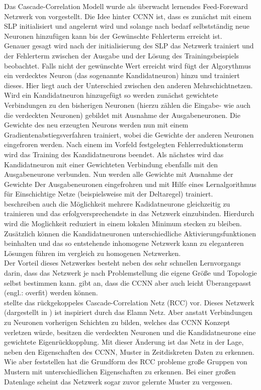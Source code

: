 Das Cascade-Correlation Modell wurde als überwacht lernendes Feed-Foreward Netzwerk von \citet{Fahlman1990} vorgestellt. Die Idee hinter CCNN ist, dass es zunächst mit einem SLP initialisiert und angelernt wird und solange nach bedarf selbstständig neue Neuronen hinzufügen kann bis der Gewünschte Fehlerterm erreicht ist.\\
Genauer gesagt wird nach der initialisierung des SLP das Netzwerk trainiert und der Fehlerterm zwischen der Ausgabe und der Lösung des Trainingsbeispiels beobachtet. Falls nicht der gewünschte Wert erreicht wird fügt der Algorythmus ein verdecktes Neuron (das sogenannte Kandidatneuron) hinzu und trainiert dieses. Hier liegt auch der Unterschied zwischen den anderen Mehrschichtnetzen. Wird ein Kandidatneuron hinzugefügt so werden zunächst gewichtete Verbindungen zu den bisherigen Neuronen (hierzu zählen die Eingabe- wie auch die verdeckten Neuronen) gebildet mit Ausnahme der Ausgabeneuronen. Die Gewichte des neu erzeugten Neurons werden nun mit einem Gradientenabstiegsverfahren trainiert, wobei die Gewichte der anderen Neuronen eingefroren werden. Nach einem im Vorfeld festgelegten Fehlerreduktionsterm wird das Training des Kandidatneurons beendet. Als nächstes wird das Kandidatneuron mit einer Gewichteten Verbindung ebenfalls mit den Ausgabeneurone verbunden. Nun werden alle Gewichte mit Ausnahme der Gewichte Der Ausgabeneuronen eingefrohren und mit Hilfe eines Lernalgorithmus für Einschichtige Netze (beispielsweise mit der Deltaregel) trainiert.\\
\citet{Fahlman1990} beschreiben auch die Möglichkeit mehrere Kadidatneurone gleichzeitig zu trainieren und das erfolgversprechendste in das Netzwerk einzubinden. Hierdurch wird die Moglichkeit reduziert in einem lokalen Minimum stecken zu bleiben. Zusätzlich können die Kandidatneuronen unterschiedliche Aktivierungsfunktionen beinhalten und das so entstehende inhomogene Netzwerk kann zu eleganteren Lösungen führen im vergleich zu homogenen Netzwerken.\\
Der Vorteil dieses Netzwerkes besteht neben des sehr schnellen Lernvorgangs darin, dass das Netzwerk je nach Problemstellung die eigene Größe und Topologie selbst bestimmen kann. \citet{Balazs2009} gibt an, dass die CCNN aber auch leicht Überangepasst (engl.: overfit) werden können.\\
\citet{Fahlman1991} stellte das rückgekoppeles Cascade-Correlation Netz (RCC) vor. Dieses Netzwerk (dargestellt in ) ist inspiriert durch das Elamn Netz. Aber anstatt Verbindungen zu Neuronen vorherigen Schichten zu bilden, welches das CCNN Konzept verletzen würde, besitzen die verdeckten Neuronen und die Kandidatneurone eine gewichtete Eigenrückkopplung. Mit dieser Änderung ist das Netz in der Lage, neben den Eigenschaften des CCNN, Muster in Zeitdiskreten Daten zu erkennen. Wie aber \citet{Kirschninga1995} feststellen hat die Grundform des RCC probleme große Gruppen von Mustern mit unterschiedlichen Eigenschaften zu erkennen. Bei einer großen Datenlage scheint das Netzwerk sogar zuvor gelernte Muster zu vergessen.  




